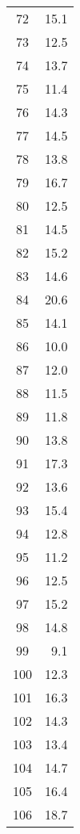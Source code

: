 \begin{multicols}{4}
\begin{table}[H]
\begin{tabular}{|c|r|}
            \hline
        \end{tabular}
    \end{table}
    \columnbreak
    \begin{table}[H]
        \centering
        \begin{tabular}{|c|r|}
            \hline
            72 & 15.1 \\
            73 & 12.5 \\
            74 & 13.7 \\
            75 & 11.4 \\
            76 & 14.3 \\
            77 & 14.5 \\
            78 & 13.8 \\
            79 & 16.7 \\
            80 & 12.5 \\
            81 & 14.5 \\
            82 & 15.2 \\
            83 & 14.6 \\
            84 & 20.6 \\
            85 & 14.1 \\
            86 & 10.0 \\
            87 & 12.0 \\
            88 & 11.5 \\
            89 & 11.8 \\
            90 & 13.8 \\
            91 & 17.3 \\
            92 & 13.6 \\
            93 & 15.4 \\
            94 & 12.8 \\
            95 & 11.2 \\
            96 & 12.5 \\
            97 & 15.2 \\
            98 & 14.8 \\
            99 & 9.1 \\
            100 & 12.3 \\
            101 & 16.3 \\
            102 & 14.3 \\
            103 & 13.4 \\
            104 & 14.7 \\
            105 & 16.4 \\
            106 & 18.7 \\

\end{tabular}
\end{table}
\end{multicols}
